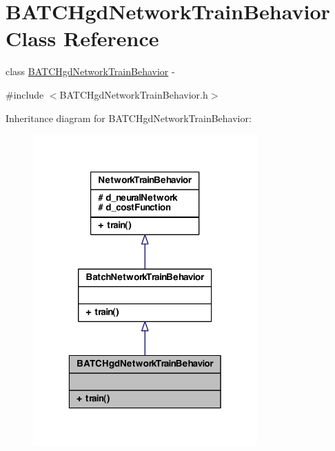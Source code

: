 \hypertarget{class_b_a_t_c_hgd_network_train_behavior}{
\section{BATCHgdNetworkTrainBehavior Class Reference}
\label{class_b_a_t_c_hgd_network_train_behavior}
}


class \hyperlink{class_b_a_t_c_hgd_network_train_behavior}{BATCHgdNetworkTrainBehavior} -\/  




{\ttfamily \#include $<$BATCHgdNetworkTrainBehavior.h$>$}



Inheritance diagram for BATCHgdNetworkTrainBehavior:
\nopagebreak
\begin{figure}[H]
\begin{center}
\leavevmode
\includegraphics[width=244pt]{class_b_a_t_c_hgd_network_train_behavior__inherit__graph}
\end{center}
\end{figure}


